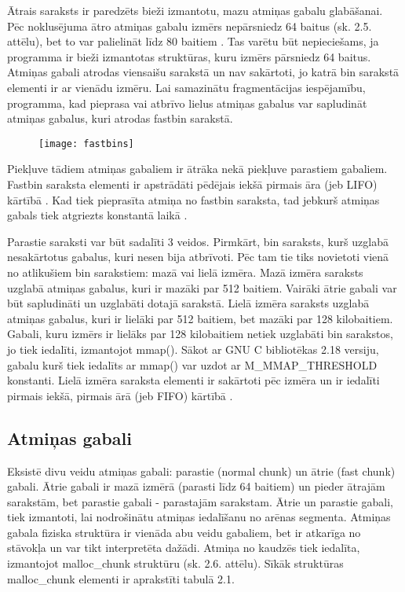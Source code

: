 Ātrais saraksts ir paredzēts bieži izmantotu, mazu atmiņas gabalu glabāšanai.
Pēc noklusējuma ātro atmiņas gabalu izmērs nepārsniedz 64 baitus (sk. 2.5. attēlu), bet to var palielināt līdz 80 baitiem \cite {MALLOC}. 
Tas varētu būt nepieciešams, ja programma ir bieži izmantotas struktūras, kuru izmērs pārsniedz 64 baitus.
Atmiņas gabali atrodas viensaišu sarakstā un nav sakārtoti, jo katrā bin sarakstā elementi ir ar vienādu izmēru.
Lai samazinātu fragmentācijas iespējamību, programma, kad pieprasa vai atbrīvo lielus atmiņas gabalus var sapludināt atmiņas gabalus, kuri atrodas fastbin sarakstā.
\begin{figure}[h]
\begin{center}
\texttt{[image: fastbins]}
\end{center}
\caption{\textbf{\fontsize{11}{12}\selectfont {Ātrais saraksts}}}
\label{fig:fastbin}
\end{figure}
Piekļuve tādiem atmiņas gabaliem ir ātrāka nekā piekļuve parastiem gabaliem. 
Fastbin saraksta elementi ir apstrādāti pēdējais iekšā pirmais āra (jeb LIFO) kārtībā \cite {Binning}.
Kad tiek pieprasīta atmiņa no fastbin saraksta, tad jebkurš atmiņas gabals tiek atgriezts konstantā laikā  \cite {ACCA}.

Parastie saraksti var būt sadalīti 3 veidos. Pirmkārt, bin saraksts, kurš uzglabā nesakārtotus gabalus, kuri nesen bija atbrīvoti.  
Pēc tam tie tiks novietoti vienā no atlikušiem bin sarakstiem: mazā vai lielā izmēra. 
Mazā izmēra saraksts uzglabā atmiņas gabalus, kuri ir mazāki par 512 baitiem. 
Vairāki ātrie gabali var būt sapludināti un uzglabāti dotajā sarakstā. 
Lielā izmēra saraksts uzglabā atmiņas gabalus, kuri ir lielāki par 512 baitiem, bet mazāki par 128 kilobaitiem. 
Gabali, kuru izmērs ir lielāks par 128 kilobaitiem netiek uzglabāti bin sarakstos, jo tiek iedalīti, izmantojot mmap(). 
Sākot ar GNU C bibliotēkas 2.18 versiju, gabalu kurš tiek iedalīts ar mmap() var uzdot ar M\_MMAP\_THRESHOLD konstanti.
Lielā izmēra saraksta elementi ir sakārtoti pēc izmēra un ir iedalīti pirmais iekšā, pirmais ārā (jeb FIFO) kārtībā \cite {Binning}. 


\subsection{Atmiņas gabali}
\label{subsec:atminas_gabali}
Eksistē divu veidu atmiņas gabali: parastie (normal chunk) un ātrie (fast chunk) gabali. 
Ātrie gabali ir mazā izmērā (parasti līdz 64 baitiem) un pieder ātrajām sarakstām, bet parastie gabali - parastajām sarakstam. 
Ātrie un parastie gabali, tiek izmantoti, lai nodrošinātu atmiņas iedalīšanu no arēnas segmenta.
Atmiņas gabala fiziska struktūra ir vienāda abu veidu gabaliem, bet ir atkarīga no stāvokļa un var tikt interpretēta dažādi.
Atmiņa no kaudzēs tiek iedalīta, izmantojot malloc\_chunk struktūru (sk. 2.6. attēlu). 
Sīkāk struktūras malloc\_chunk elementi ir aprakstīti tabulā 2.1.

